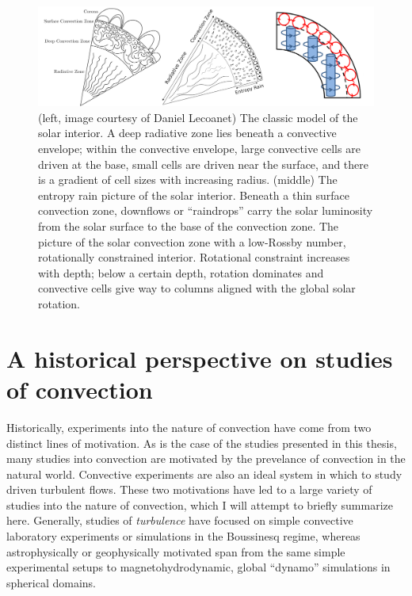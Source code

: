 \begin{figure}[ht!]
\includegraphics[width=\textwidth]{./figs/intro/conundrum_explanations.pdf}
\caption[Solar velocity power spectra.]
{
	(left, image courtesy of Daniel Lecoanet) The classic model of the solar interior.
	A deep radiative zone lies beneath a convective envelope; within the convective envelope, large convective cells are driven at the base, small cells are driven near the surface, and there is a gradient of cell sizes with increasing radius.
	(middle) The entropy rain picture of the solar interior.
	Beneath a thin surface convection zone, downflows or ``raindrops'' carry the solar luminosity from the solar surface to the base of the convection zone. 
	\citep[right, Fig.~3c of][]{featherstone&hindman2016b} The picture of the solar convection zone with a low-Rossby number, rotationally constrained interior.
	Rotational constraint increases with depth; below a certain depth, rotation dominates and convective cells give way to columns aligned with the global solar rotation.
	\label{fig:asteroseismology} 
}
\end{figure}




\section{A historical perspective on studies of convection}
Historically, experiments into the nature of convection have come from two distinct lines of motivation.
As is the case of the studies presented in this thesis, many studies into convection are motivated by the prevelance of convection in the natural world.
Convective experiments are also an ideal system in which to study driven turbulent flows.
These two motivations have led to a large variety of studies into the nature of convection, which I will attempt to briefly summarize here.
Generally, studies of \emph{turbulence} have focused on simple convective laboratory experiments or simulations in the Boussinesq regime, whereas astrophysically or geophysically motivated span from the same simple experimental setups to magnetohydrodynamic, global ``dynamo'' simulations in spherical domains.


